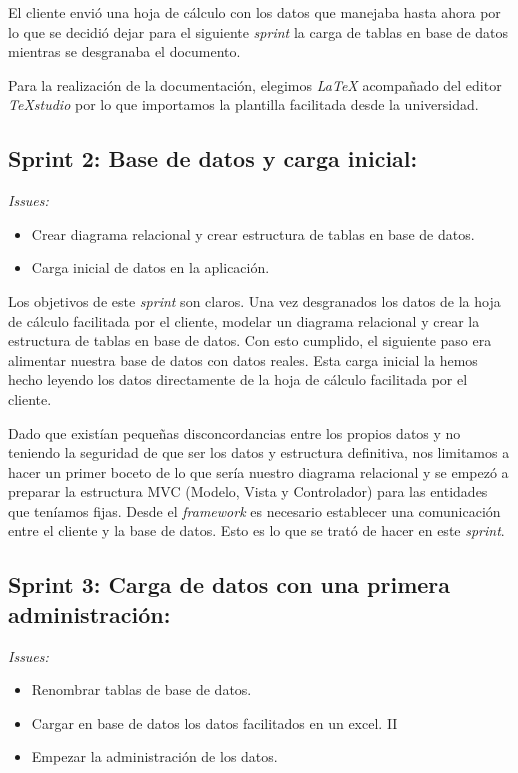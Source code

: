 El cliente envió una hoja de cálculo con los datos que manejaba hasta ahora por lo que se decidió dejar para el siguiente \textit{sprint} la carga de tablas en base de datos mientras se desgranaba el documento.

Para la realización de la documentación, elegimos \textit{LaTeX} acompañado del editor \textit{TeXstudio} por lo que importamos la plantilla facilitada desde la universidad.

\subsection{Sprint 2: Base de datos y carga inicial:}

\textit{Issues:}
\begin{itemize}
	\item Crear diagrama relacional y crear estructura de tablas en base de datos.
	\item Carga inicial de datos en la aplicación.
\end{itemize}

Los objetivos de este \textit{sprint} son claros. Una vez desgranados los datos de la hoja de cálculo facilitada por el cliente, modelar un diagrama relacional y crear la estructura de tablas en base de datos. Con esto cumplido, el siguiente paso era alimentar nuestra base de datos con datos reales. Esta carga inicial la hemos hecho leyendo los datos directamente de la hoja de cálculo facilitada por el cliente.

Dado que existían pequeñas disconcordancias entre los propios datos y no teniendo la seguridad de que ser los datos y estructura definitiva, nos limitamos a hacer un primer boceto de lo que sería nuestro diagrama relacional y se empezó a preparar la estructura MVC (Modelo, Vista y Controlador) para las entidades que teníamos fijas. Desde el \textit{framework} es necesario establecer una comunicación entre el cliente y la base de datos. Esto es lo que se trató de hacer en este \textit{sprint}.

\subsection{Sprint 3: Carga de datos con una primera administración:}
\textit{Issues:}
\begin{itemize}
	\item Renombrar tablas de base de datos.
	\item Cargar en base de datos los datos facilitados en un excel. II 
	\item Empezar la administración de los datos.
\end{itemize}

